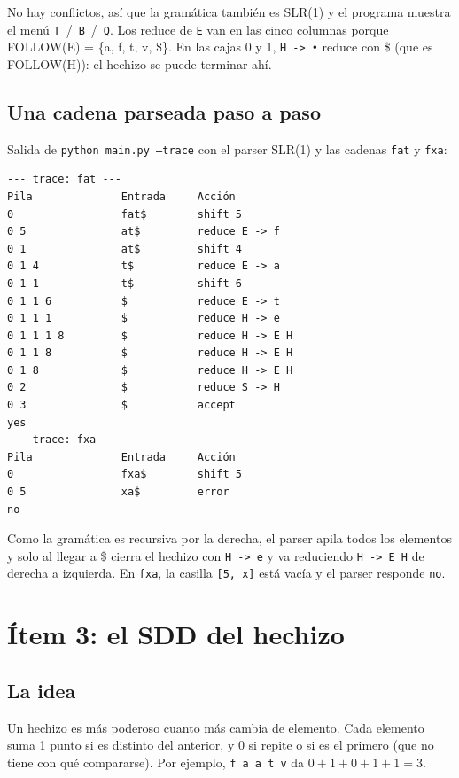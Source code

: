\documentclass[11pt,a4paper]{article}
\newcommand{\code}[1]{\texttt{#1}}
\begin{document}
No hay conflictos, así que la gramática también es SLR(1) y el programa muestra el menú \code{T}~/~\code{B}~/~\code{Q}. Los reduce de \code{E} van en las cinco columnas porque FOLLOW(E) = \{a, f, t, v, \$\}. En las cajas 0 y 1, \code{H -> •} reduce con \$ (que es FOLLOW(H)): el hechizo se puede terminar ahí.

\subsection{Una cadena parseada paso a paso}

Salida de \code{python main.py --trace} con el parser SLR(1) y las cadenas \code{fat} y \code{fxa}:

\begin{Verbatim}
--- trace: fat ---
Pila              Entrada     Acción
0                 fat$        shift 5
0 5               at$         reduce E -> f
0 1               at$         shift 4
0 1 4             t$          reduce E -> a
0 1 1             t$          shift 6
0 1 1 6           $           reduce E -> t
0 1 1 1           $           reduce H -> e
0 1 1 1 8         $           reduce H -> E H
0 1 1 8           $           reduce H -> E H
0 1 8             $           reduce H -> E H
0 2               $           reduce S -> H
0 3               $           accept
yes
--- trace: fxa ---
Pila              Entrada     Acción
0                 fxa$        shift 5
0 5               xa$         error
no
\end{Verbatim}

Como la gramática es recursiva por la derecha, el parser apila todos los elementos y solo al llegar a \$ cierra el hechizo con \code{H -> e} y va reduciendo \code{H -> E H} de derecha a izquierda. En \code{fxa}, la casilla \code{[5, x]} está vacía y el parser responde \code{no}.

\section{Ítem 3: el SDD del hechizo}

\subsection{La idea}

Un hechizo es más poderoso cuanto más cambia de elemento. Cada elemento suma 1 punto si es distinto del anterior, y 0 si repite o si es el primero (que no tiene con qué compararse). Por ejemplo, \code{f a a t v} da $0+1+0+1+1 = 3$.
\end{document}

